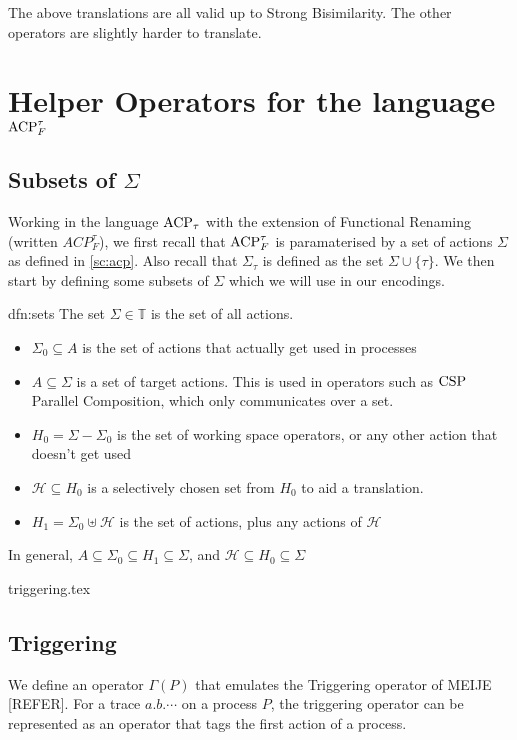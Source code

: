 \documentclass[../hons_project.tex]{subfiles}
\begin{document}
The above translations are all valid up to Strong Bisimilarity. The other operators are slightly harder to translate.

\section{Helper Operators for the language \texorpdfstring{$\mathrm{ACP}_{F}^{\tau}$}{ACPtf}}

\subsection{Subsets of \texorpdfstring{$\Sigma$}{Sigma}}
Working in the language $\mathrm{ACP}_{\tau}$ with the extension of Functional Renaming (written $ACP^{\tau}_{F}$), we first recall that $\mathrm{ACP}_{F}^{\tau}$ is paramaterised by a set of actions $\Sigma$ as defined in \cref{sc:acp}. Also recall that $\Sigma_{\tau}$ is defined as the set $\Sigma \cup \{\tau\}$. We then start by defining some subsets of $\Sigma$ which we will use in our encodings.

\begin{dfn}[Subsets of A]{dfn:sets}{}
	The set $\Sigma\in \mathbb{T}$ is the set of all actions.
	\begin{itemize}
		\item $\Sigma_{0} \subseteq A$ is the set of actions that actually get used in processes
		\item $A \subseteq \Sigma$ is a set of target actions. This is used in operators such as $\mathrm{CSP}$ Parallel Composition, which only communicates over a set.
		\item $H_{0} = \Sigma - \Sigma_{0}$ is the set of working space operators, or any other action that doesn't get used
		\item $\mathscr{H} \subseteq H_{0}$ is a selectively chosen set from $H_{0}$ to aid a translation.
		\item $H_{1} = \Sigma_{0} \uplus \mathscr{H}$ is the set of actions, plus any actions of $\mathscr{H}$
	\end{itemize}

	In general, $A \subseteq \Sigma_{0} \subseteq H_{1} \subseteq \Sigma$, and $\mathscr{H} \subseteq H_{0} \subseteq \Sigma$
\end{dfn}

{triggering.tex}
\subsection{Triggering}
We define an operator $\Gamma(P)$ that emulates the Triggering operator of MEIJE [REFER]. For a trace $a.b.\cdots$ on a process $P$, the triggering operator can be represented as an operator that tags the first action of a process.
\end{document}
